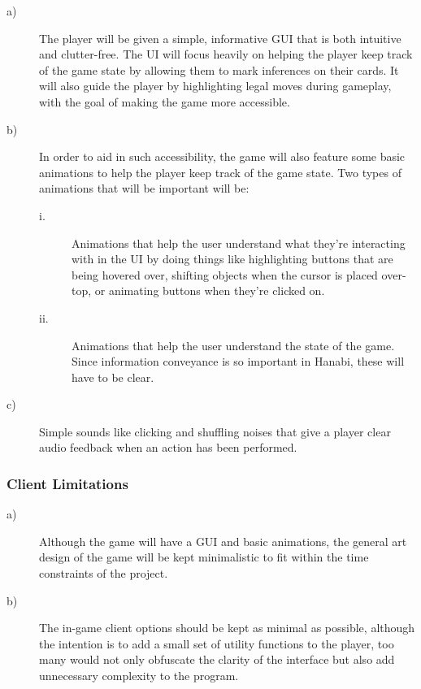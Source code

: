 \documentclass[12pt]{article}
\begin{document}
\begin{description}

\item [a)]
The player will be given a simple, informative GUI that is both intuitive and
clutter-free.  The UI will focus heavily on helping the player keep track
of the game state by allowing them to mark inferences on their cards. It will also
guide the player by highlighting legal moves during gameplay, with the goal
of making the game more accessible.

\item [b)]
In order to aid in such accessibility, the game will also feature some basic
animations to help the player keep track of the game state.  Two types of animations
that will be important will be:

\begin{description}
\item[i.] Animations that help the user understand what they're interacting with in
the UI by doing things like highlighting buttons that are being hovered over, 
shifting objects when the cursor is placed over-top, or animating buttons when
they're clicked on.

\item[ii.] Animations that help the user understand the state of the game.  Since
information conveyance is so important in Hanabi, these will have to be
clear.

\end{description}
\item [c)]
Simple sounds like clicking and shuffling noises that give a player
clear audio feedback when an action has been performed.
\end{description}

\subsubsection{Client Limitations}
\begin{description}
\item[a)]
Although the game will have a GUI and basic animations, the general art
design of the game will be kept minimalistic to fit within the time
constraints of the project.
\item[b)]
The in-game client options should be kept as minimal as possible, although
the intention is to add a small set of utility functions to the player, too many
would not only obfuscate the clarity of the interface but also add unnecessary 
complexity to the program.
\end{description}
\end{document}
